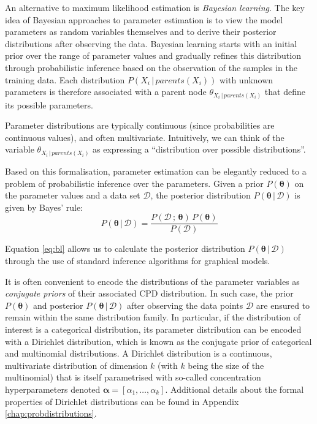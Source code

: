 An alternative to maximum likelihood estimation is \textit{Bayesian learning}.  The key idea of Bayesian approaches to parameter estimation is to view the model parameters as random variables themselves and to derive their posterior distributions after observing the data.  Bayesian learning starts with an initial prior over the range of parameter values and gradually refines this distribution through probabilistic inference based on the observation of the samples in the training data. Each distribution $P(X_i \, | \, \mathit{parents}(X_i))$ with unknown parameters is therefore associated with a parent node $\theta_{X_i\, | \, \mathit{parents}(X_i)}$ that define its possible parameters.

Parameter distributions are typically continuous (since probabilities are continuous values), and often multivariate.  Intuitively, we can think of the variable $\theta_{X_i \, | \, \mathit{parents}(X_i)}$ as expressing a ``distribution over possible distributions''.  

Based on this formalisation, parameter estimation can be elegantly reduced to a problem of probabilistic inference over the parameters. Given a prior $P(\boldsymbol\theta)$ on the parameter values and a data set $\mathcal{D}$, the posterior distribution $P(\boldsymbol\theta  \, | \, \mathcal{D})$ is given by Bayes' rule: 
\begin{equation}
P(\boldsymbol\theta  \, | \, \mathcal{D}) =  \frac{P(\mathcal{D} \, ; \, \boldsymbol\theta) \, P(\boldsymbol\theta)}{P(\mathcal{D})} \label{eq:bl}
\end{equation}


Equation \eqref{eq:bl} allows us to calculate the posterior distribution $P(\boldsymbol\theta  \, | \, \mathcal{D})$ through the use of standard inference algorithms for graphical models. 

It is often convenient to encode the distributions of the parameter variables as \textit{conjugate priors} of their associated CPD distribution. In such case, the prior $P(\boldsymbol\theta)$ and posterior $P(\boldsymbol\theta  \, | \, \mathcal{D})$ after observing the data points $\mathcal{D}$ are ensured to remain within the same distribution family. In particular, if the distribution of interest is a categorical distribution, its parameter distribution can be encoded with a Dirichlet distribution, which is known as the conjugate prior of categorical and multinomial distributions. A Dirichlet distribution is a continuous, multivariate distribution of dimension $k$ (with $k$ being the size of the multinomial) that is itself parametrised with so-called concentration hyperparameters denoted $\boldsymbol\alpha = [ \alpha_1, \dots, \alpha_k ]$. Additional details about the formal properties of Dirichlet distributions can be found in Appendix \ref{chap:probdistributions}.

